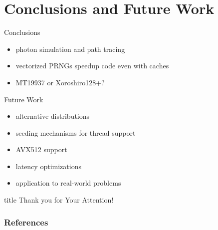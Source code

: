 \documentclass[aspectratio=169]{beamer}
\begin{document}
  \section{Conclusions and Future Work} %
  \label{sec:conclusions}
    \begin{frame}{Conclusions}
      \begin{itemize}
        \pause\item photon simulation and path tracing
        \pause\item vectorized PRNGs speedup code even with caches
        \pause\item MT19937 or Xoroshiro128+?
      \end{itemize}
    \end{frame}
    \begin{frame}{Future Work}
      \begin{itemize}
        \pause\item alternative distributions
        \pause\item seeding mechanisms for thread support
        \pause\item AVX512 support
        \pause\item latency optimizations
        \pause\item application to real-world problems
      \end{itemize}
    \end{frame}

  \begin{frame}
    \vfill
    \centering
    \begin{beamercolorbox}[sep=8pt,center,shadow=true,rounded=true]{title}
      Thank you for Your Attention!%
      \par%
    \end{beamercolorbox}
    \vfill
  \end{frame}

  \begin{frame}
      \frametitle{References}
      \tiny
      \begin{multicols}{2}
        \nocite{*}
        
      \end{multicols}
    \end{frame}
\end{document}
